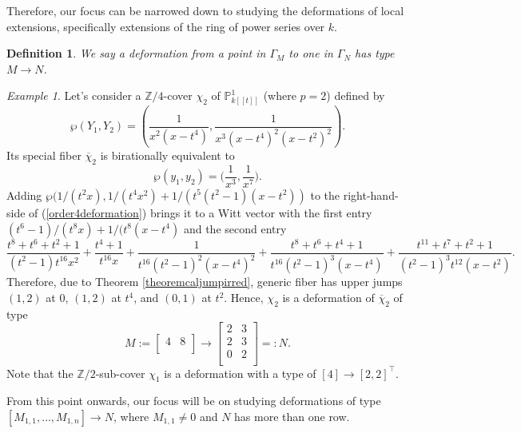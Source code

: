 \documentclass{compositio}
\newtheorem{definition}[theorem]{Definition}
\theoremstyle{remark}
\newtheorem{example}[theorem]{Example}
\theoremstyle{remark}
\begin{document}
Therefore, our focus can be narrowed down to studying the deformations of local extensions, specifically extensions of the ring of power series over $k$.




\begin{definition}
    We say a deformation from a point in $\Gamma_{M}$ to one in $\Gamma_{N}$  has \emph{type} $M \xrightarrow{} N$.
\end{definition}



\begin{example}
\label{examplenonossdeformation}
Let's consider a $\mathbb{Z}/4$-cover $\chi_2$ of $\mathbb{P}^1_{k[[t]]}$ (where $p=2$) defined by
\begin{equation}
\label{order4deformation}
\wp(Y_1,Y_2)=\left(\frac{1}{x^2(x-t^4)}, \frac{1}{x^3(x-t^4)^2(x-t^2)^2}\right).
\end{equation}
Its special fiber $\overline{\chi}_2$ is birationally equivalent to
\[ \wp(y_1,y_2)=\bigg( \frac{1}{x^3}, \frac{1}{x^7} \bigg). \]
Adding $\wp(1/(t^2x), 1/(t^4x^2)+ 1/(t^5(t^2-1)(x-t^2))$ to the right-hand-side of (\ref{order4deformation}) brings it to a Witt vector with the first entry $(t^6-1)/(t^8x)+1/(t^8(x-t^4)$ and the second entry
\begin{equation*}
    \frac{t^8+t^6+t^2+1}{(t^2-1)t^{16}x^2}+ \frac{t^4+1}{t^{16}x}+\frac{1}{t^{16}(t^2-1)^2(x-t^4)^2} + \frac{t^8+t^6+t^4+1}{t^{16}(t^2-1)^3(x-t^4)}+\frac{t^{11}+t^7+t^2+1}{(t^2-1)^3t^{12}(x-t^2)}.
\end{equation*}
Therefore, due to Theorem \ref{theoremcaljumpirred}, generic fiber has upper jumps $(1,2)$ at $0$, $(1,2)$ at $t^4$, and $(0,1)$ at $t^2$. Hence, $\chi_2$ is a deformation of $\overline{\chi}_2$ of type
\[M:= \begin{bmatrix}
4 & 8 \\
\end{bmatrix} \xrightarrow{}  \begin{bmatrix}
   2 & 3 \\
   2 & 3 \\
   0 & 2\\
   \end{bmatrix}=:N. \] 
Note that the $\mathbb{Z}/2$-sub-cover $\chi_1$ is a deformation with a type of $[4] \to [2,2]^{\top}$. 
\end{example}


From this point onwards, our focus will be on studying deformations of type $[M_{1,1}, \ldots, M_{1, n}] \to N$, where $M_{1,1} \neq 0$ and $N$ has more than one row. 
\end{document}
